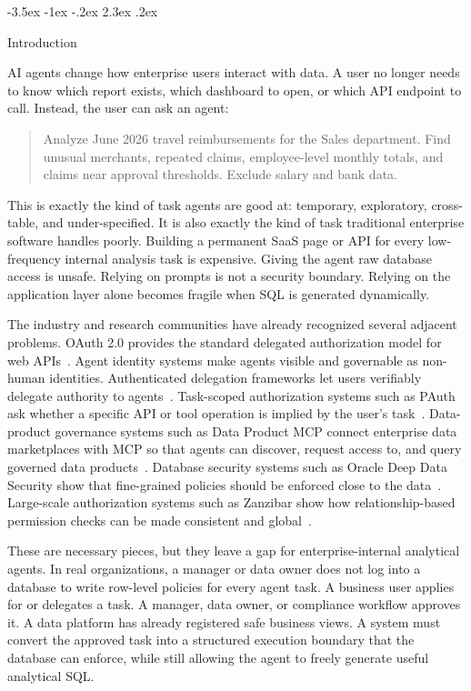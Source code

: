 \documentclass[10pt,twocolumn]{article}
\makeatletter
\renewcommand\section{\@startsection{section}{1}{\z@}%
  {-3.5ex \@plus -1ex \@minus -.2ex}%
  {2.3ex \@plus .2ex}%
  {\normalfont\Large\bfseries\raggedright}}
\makeatother
\begin{document}
\hypertarget{introduction}{%
\section{Introduction}\label{introduction}}

AI agents change how enterprise users interact with data. A user no
longer needs to know which report exists, which dashboard to open, or
which API endpoint to call. Instead, the user can ask an agent:

\begin{quote}
Analyze June 2026 travel reimbursements for the Sales department. Find
unusual merchants, repeated claims, employee-level monthly totals, and
claims near approval thresholds. Exclude salary and bank data.
\end{quote}

This is exactly the kind of task agents are good at: temporary,
exploratory, cross-table, and under-specified. It is also exactly the
kind of task traditional enterprise software handles poorly. Building a
permanent SaaS page or API for every low-frequency internal analysis
task is expensive. Giving the agent raw database access is unsafe.
Relying on prompts is not a security boundary. Relying on the
application layer alone becomes fragile when SQL is generated
dynamically.

The industry and research communities have already recognized several
adjacent problems. OAuth 2.0 provides the standard delegated
authorization model for web APIs~\cite{rfc6749}. Agent identity systems
make agents visible and governable as non-human identities.
Authenticated delegation frameworks let users verifiably delegate
authority to agents~\cite{south2025authenticateddelegation}.
Task-scoped authorization systems such as PAuth ask whether a specific
API or tool operation is implied by the user's
task~\cite{sharma2026pauth}. Data-product governance systems such as
Data Product MCP connect enterprise data marketplaces with MCP so that
agents can discover, request access to, and query governed data
products~\cite{tonnarelli2026dataproductmcp,mcp2025specification}.
Database security systems such as Oracle Deep Data Security show that
fine-grained policies should be enforced close to the
data~\cite{oracle2026deepdatasecuritydocs,oracle2026deepdatasecuritybrief}.
Large-scale authorization systems such as Zanzibar show how
relationship-based permission checks can be made consistent and
global~\cite{pang2019zanzibar}.

These are necessary pieces, but they leave a gap for enterprise-internal
analytical agents. In real organizations, a manager or data owner does
not log into a database to write row-level policies for every agent
task. A business user applies for or delegates a task. A manager, data
owner, or compliance workflow approves it. A data platform has already
registered safe business views. A system must convert the approved task
into a structured execution boundary that the database can enforce,
while still allowing the agent to freely generate useful analytical SQL.
\end{document}
